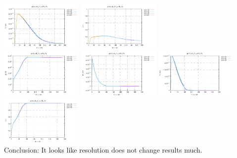 \begin{center}
\includegraphics[width=4cm]{python_codes/fieldstone_126/results/model3/pt4_v.pdf}
\includegraphics[width=4cm]{python_codes/fieldstone_126/results/model3/pt4_Ovp.pdf}\\
\includegraphics[width=4cm]{python_codes/fieldstone_126/results/model3/pt5_p.pdf}
\includegraphics[width=4cm]{python_codes/fieldstone_126/results/model3/pt5_u.pdf}
\includegraphics[width=4cm]{python_codes/fieldstone_126/results/model3/pt5_v.pdf}
\includegraphics[width=4cm]{python_codes/fieldstone_126/results/model3/pt5_Ovp.pdf}\\
{\captionfont Conclusion: It looks like resolution does not change results much.}
\end{center}

